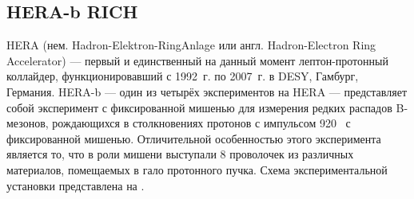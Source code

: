 

\subsection{HERA-b RICH}\label{sec:HerabRich}



HERA (нем. Hadron-Elektron-RingAnlage или англ. Hadron-Electron Ring Accelerator) --- первый и единственный на данный момент лептон-протонный коллайдер, функционировавший с 1992~г. по 2007~г. в DESY, Гамбург, Германия. HERA-b --- один из четырёх экспериментов на HERA --- представляет собой эксперимент с фиксированной мишенью для измерения редких распадов B-мезонов, рождающихся в столкновениях протонов с импульсом 920~\GeVoverC{} с фиксированной мишенью. Отличительной особенностью этого эксперимента является то, что в роли мишени выступали 8 проволочек из различных материалов, помещаемых в гало протонного пучка. Схема экспериментальной установки представлена на .

